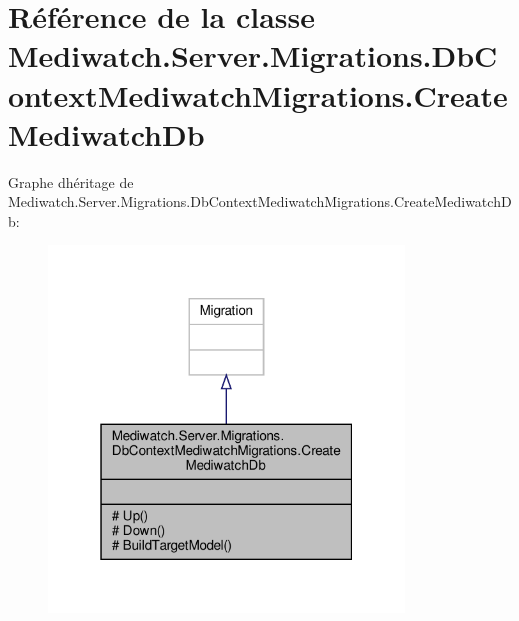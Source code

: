 \hypertarget{class_mediwatch_1_1_server_1_1_migrations_1_1_db_context_mediwatch_migrations_1_1_create_mediwatch_db}{}\section{Référence de la classe Mediwatch.\+Server.\+Migrations.\+Db\+Context\+Mediwatch\+Migrations.\+Create\+Mediwatch\+Db}
\label{class_mediwatch_1_1_server_1_1_migrations_1_1_db_context_mediwatch_migrations_1_1_create_mediwatch_db}


Graphe d\textquotesingle{}héritage de Mediwatch.\+Server.\+Migrations.\+Db\+Context\+Mediwatch\+Migrations.\+Create\+Mediwatch\+Db\+:
\nopagebreak
\begin{figure}[H]
\begin{center}
\leavevmode
\includegraphics[width=268pt]{class_mediwatch_1_1_server_1_1_migrations_1_1_db_context_mediwatch_migrations_1_1_create_mediwatch_db__inherit__graph}
\end{center}
\end{figure}



